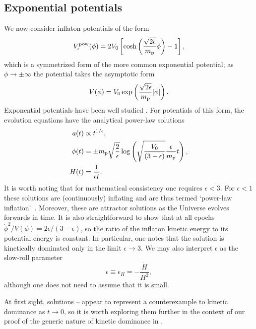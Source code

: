 \subsection{Exponential potentials}
\label{sec:Exponential_potentials}
We now consider inflaton potentials of the form 
%
\begin{equation}
  V^\mathrm{pow}_\epsilon(\phi) 
  = 
  2V_0\left[
  \cosh\left(\frac{\sqrt{2\epsilon}}{m_{\mathrm{p}}}\phi\right)-1
  \right],
  \label{eqn:coshpot}
\end{equation}
%
which is a symmetrized form of the more common exponential potential;
as $\phi\rightarrow\pm\infty$ the potential takes the asymptotic form
%
\begin{equation}
  V(\phi) 
  = 
  V_0 \exp\left(\frac{\sqrt{2\epsilon}}{m_{\mathrm{p}}} |\phi|\right).
  \label{eqn:exp_pot}
\end{equation}
%
Exponential potentials  have been well studied
\citep{yokoyama_dynamics_1988}. For potentials of this form, the
evolution equations have the analytical power-law solutions
%
\begin{align}
  a(t) 
  &\propto 
  {t}^{1/\epsilon},
  \label{eqn:pow_law_a_sol}
  \\
  \phi(t)
  &=
  \pm m_{\mathrm{p}}\sqrt{\frac{2}{\epsilon}}
  \log\left(\sqrt{\frac{V_0}{\left(3-\epsilon\right)}}
  \frac{\epsilon}{m_{\mathrm{p}}} t\right),
  \\
  H(t)
  &=
  \frac{1}{\epsilon t}.  
  \label{eqn:pow_law_H_sol}
\end{align}
%
It is worth noting that for mathematical consistency one requires
$\epsilon < 3$. For $\epsilon<1$ these solutions are (continuously)
inflating and are thus termed `power-law
inflation'~\citep{lucchin_power-law_1985}. Moreover, these are
attractor solutions as the Universe evolves forwards in time. It is
also straightforward to show that at all epochs $\dot{\phi}^2/V(\phi)
= 2\epsilon/(3-\epsilon)$, so the ratio of the inflaton kinetic energy
to its potential energy is constant. In particular, one notes that the
solution is kinetically dominated only in the limit $\epsilon \to 3$.
We may also interpret $\epsilon$ as the slow-roll parameter 
%
\begin{equation}
  \epsilon\equiv\epsilon_H = -\frac{\dot{H}}{H^2},
\end{equation}
%
although one does not need to assume that it is small.

At first sight, solutions
-- appear to represent
a counterexample to kinetic dominance as $t \to 0$, so it is worth
exploring them further in the context of our proof of the generic
nature of kinetic dominance in
. 

